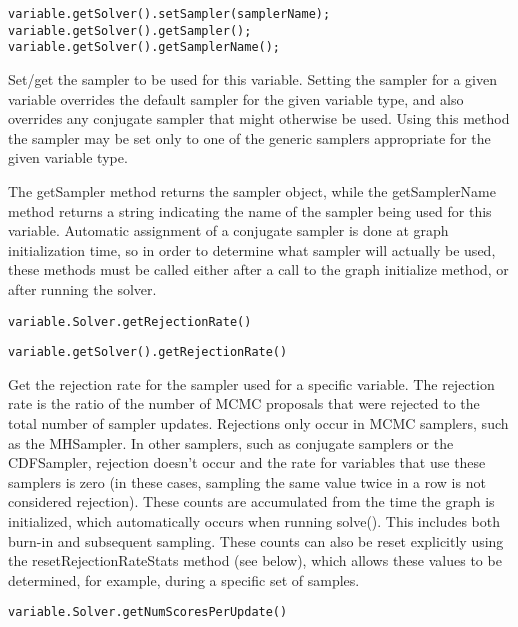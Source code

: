 \ifjava
\begin{lstlisting}
variable.getSolver().setSampler(samplerName);
variable.getSolver().getSampler();
variable.getSolver().getSamplerName();
\end{lstlisting}
\fi

Set/get the sampler to be used for this variable.  Setting the sampler for a given variable overrides the default sampler for the given variable type, and also overrides any conjugate sampler that might otherwise be used.  Using this method the sampler may be set only to one of the generic samplers appropriate for the given variable type.

The getSampler method returns the sampler object, while the getSamplerName method returns a string indicating the name of the sampler being used for this variable.  Automatic assignment of a conjugate sampler is done at graph initialization time, so in order to determine what sampler will actually be used, these methods must be called either after a call to the graph initialize method, or after running the solver.

\ifmatlab
\begin{lstlisting}
variable.Solver.getRejectionRate()
\end{lstlisting}
\fi

\ifjava
\begin{lstlisting}
variable.getSolver().getRejectionRate()
\end{lstlisting}
\fi

Get the rejection rate for the sampler used for a specific variable.  The rejection rate is the ratio of the number of MCMC proposals that were rejected to the total number of sampler updates.  Rejections only occur in MCMC samplers, such as the MHSampler.  In other samplers, such as conjugate samplers or the CDFSampler, rejection doesn't occur and the rate for variables that use these samplers is zero (in these cases, sampling the same value twice in a row is not considered rejection).  These counts are accumulated from the time the graph is initialized, which automatically occurs when running solve().  This includes both burn-in and subsequent sampling.  These counts can also be reset explicitly using the resetRejectionRateStats method (see below), which allows these values to be determined, for example, during a specific set of samples.


\ifmatlab
\begin{lstlisting}
variable.Solver.getNumScoresPerUpdate()
\end{lstlisting}
\fi

